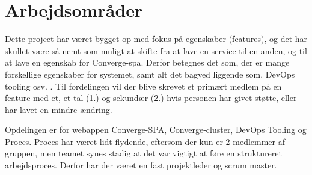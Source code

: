 \section{Arbejdsområder}

Dette project har været bygget op med fokus på egenskaber (features), og det har skullet være så nemt som muligt at skifte fra at lave en service til en anden, og til at lave en egenskab for Converge-spa. Derfor betegnes det som, der er mange forskellige egenskaber for systemet, samt alt det bagved liggende som, DevOps tooling osv. . Til fordelingen vil der blive skrevet et primært medlem på en feature med et, et-tal (1.) og sekundær (2.) hvis personen har givet støtte, eller har lavet en mindre ændring.

Opdelingen er for webappen Converge-SPA, Converge-cluster, DevOps Tooling og Proces. Proces har været lidt flydende, eftersom der kun er 2 medlemmer af gruppen, men teamet synes stadig at det var vigtigt at føre en struktureret arbejdsproces. Derfor har der været en fast projektleder og scrum master.

